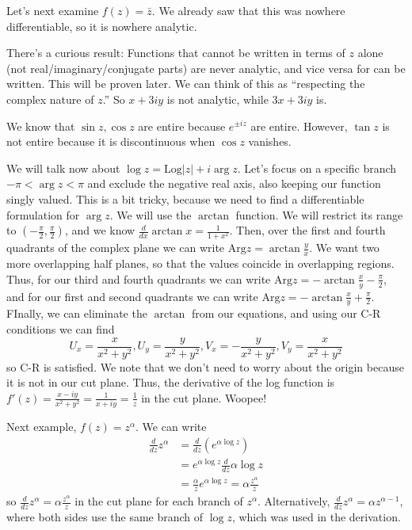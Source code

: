 \documentclass[10pt]{report}
\newcommand{\rd}[2]{\frac{d#1}{d#2}}
\newcommand{\abs}[1]{\left|#1\right|}
\newcommand{\Log}[0]{\mathrm{Log} }
\newcommand{\Arg}[0]{\mathrm{Arg} }
\begin{document}
Let's next examine $f(z) = \bar{z}$. We already saw that this was nowhere differentiable, so it is nowhere analytic.

There's a curious result: Functions that cannot be written in terms of $z$ alone (not real/imaginary/conjugate parts) are never analytic, and vice versa for can be written. This will be proven later. We can think of this as ``respecting the complex nature of $z$.'' So $x+3iy$ is not analytic, while $3x + 3iy$ is.

We know that $\sin z, \cos z$ are entire because $e^{\pm iz}$ are entire. However, $\tan z$ is not entire because it is discontinuous when $\cos z$ vanishes.

We will talk now about $\log z = \Log \abs{z} + i\arg z$. Let's focus on a specific branch $-\pi < \arg z < \pi$ and exclude the negative real axis, also keeping our function singly valued. This is a bit tricky, because we need to find a differentiable formulation for $\arg z$. We will use the $\arctan$ function. We will restrict its range to $\left( -\frac{\pi}{2},\frac{\pi}{2} \right)$, and we know $\rd{}{x}\arctan x = \frac{1}{1+x^2}$. Then, over the first and fourth quadrants of the complex plane we can write $\Arg z = \arctan \frac{y}{x}$. We want two more overlapping half planes, so that the values coincide in overlapping regions. Thus, for our third and fourth quadrants we can write $\Arg z = -\arctan \frac{x}{y} - \frac{\pi}{2}$, and for our first and second quadrants we can write $\Arg z = -\arctan \frac{x}{y} + \frac{\pi}{2}$. FInally, we can eliminate the $\arctan$ from our equations, and using our C-R conditions we can find 
$$U_x = \frac{x}{x^2 + y^2}, U_y = \frac{y}{x^2 + y^2}, V_x = -\frac{y}{x^2 + y^2}, V_y = \frac{x}{x^2 + y^2}$$
so C-R is satisfied. We note that we don't need to worry about the origin because it is not in our cut plane. Thus, the derivative of the log function is $f'(z) = \frac{x-iy}{x^2 + y^2} = \frac{1}{x+iy} = \frac{1}{z}$ in the cut plane. Woopee!

Next example, $f(z) = z^\alpha$. We can write 
\begin{align*}
	\rd{}{z}z^\alpha &= \rd{}{z}\left( e^{\alpha\log z} \right)\\
	&= e^{\alpha\log z} \rd{}{z}\alpha \log z\\
	&= \frac{\alpha}{z}e^{\alpha \log z} = \alpha \frac{z^\alpha}{z}
\end{align*}
so $\rd{}{z}z^\alpha = \alpha \frac{z^\alpha}{z}$ in the cut plane for each branch of $z^\alpha$. Alternatively, $\rd{}{z}z^\alpha = \alpha z^{\alpha-1}$, where both sides use the same branch of $\log z$, which was used in the derivation.
\end{document}
